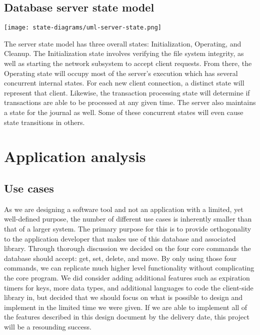 \documentclass[a4paper]{report}
\begin{document}
\section{Database server state model}

	\texttt{[image: state-diagrams/uml-server-state.png]}

	The server state model has three overall states: Initialization, Operating, and Cleanup. The Initialization state involves verifying the file system integrity, as well as starting the network subsystem to accept client requests. From there, the Operating state will occupy most of the server's execution which has several concurrent internal states. For each new client connection, a distinct state will represent that client. Likewise, the transaction processing state will determine if transactions are able to be processed at any given time. The server also maintains a state for the journal as well. Some of these concurrent states will even cause state transitions in others.

\chapter{Application analysis}

\section{Use cases}

	\begin{center}
	\end{center}

	As we are designing a software tool and not an application with a limited, yet well-defined purpose, the number of different use cases is inherently smaller than that of a larger system. The primary purpose for this is to provide orthogonality to the application developer that makes use of this database and associated library. Through thorough discussion we decided on the four core commands the database should accept: get, set, delete, and move. By only using those four commands, we can replicate much higher level functionality without complicating the core program. We did consider adding additional features such as expiration timers for keys, more data types, and additional languages to code the client-side library in, but decided that we should focus on what is possible to design and implement in the limited time we were given. If we are able to implement all of the features described in this design document by the delivery date, this project will be a resounding success.
\end{document}
